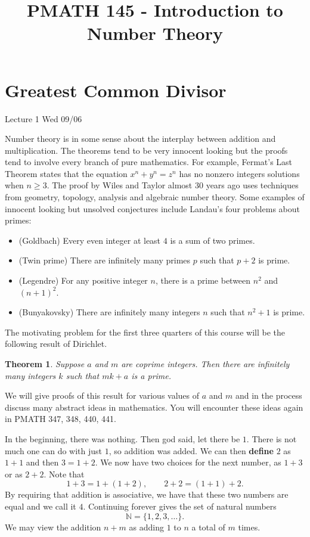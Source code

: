 \documentclass{article}
\def\N{{\mathbb N}}
\newtheorem{theorem}[subsection]{Theorem}
\newcommand{\add}[1]{{\color{blue} #1}}
\begin{document}
\title{PMATH 145 - Introduction to Number Theory}
\date{}
\maketitle

\section{Greatest Common Divisor}
\begin{center}
    \add{Lecture 1 Wed 09/06}
\end{center}

Number theory is in some sense about the interplay between addition and multiplication. The theorems tend to be very innocent looking but the proofs tend to involve every branch of pure mathematics. For example, Fermat's Last Theorem states that the equation $x^n + y^n = z^n$ has no nonzero integers solutions when $n\geq 3$. The proof by Wiles and Taylor almost 30 years ago uses techniques from geometry, topology, analysis and algebraic number theory. Some examples of innocent looking but unsolved conjectures include Landau's four problems about primes:
\begin{itemize}
    \item (Goldbach) Every even integer at least $4$ is a sum of two primes.
    \item (Twin prime) There are infinitely many primes $p$ such that $p+2$ is prime. 
    \item (Legendre) For any positive integer $n$, there is a prime between $n^2$ and $(n+1)^2$.
    \item (Bunyakovsky) There are infinitely many integers $n$ such that $n^2 + 1$ is prime. 
\end{itemize}
The motivating problem for the first three quarters of this course will be the following result of Dirichlet.

\begin{theorem}
    Suppose $a$ and $m$ are coprime integers. Then there are infinitely many integers $k$ such that $mk + a$ is a prime.
\end{theorem}

We will give proofs of this result for various values of $a$ and $m$ and in the process discuss many abstract ideas in mathematics. You will encounter these ideas again in PMATH 347, 348, 440, 441.

In the beginning, there was nothing. Then god said, let there be $1$. There is not much one can do with just $1$, so addition was added. We can then \textbf{define} $2$ as $1 + 1$ and then $3 = 1 + 2$. We now have two choices for the next number, as $1 + 3$ or as $2 + 2$. Note that
$$1 + 3 = 1 + (1 + 2),\qquad 2 + 2 = (1 + 1) + 2.$$
By requiring that addition is associative, we have that these two numbers are equal and we call it $4$. Continuing forever gives the set of natural numbers
$$\N = \{1,2,3,\ldots\}.$$
We may view the addition $n+m$ as adding $1$ to $n$ a total of $m$ times. 
\end{document}
